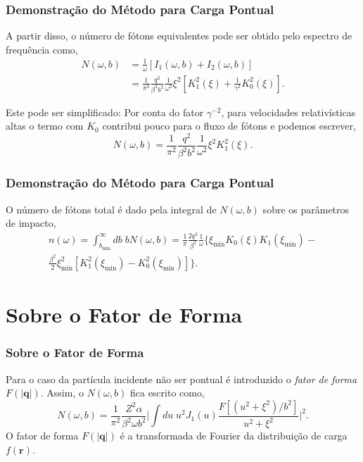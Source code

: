 \documentclass[xcolor=dvipsnames]{beamer}
\renewcommand{\vec}{\mathbf}
\begin{document}
\begin{frame}
	\frametitle{Demonstração do Método para Carga Pontual}
	A partir disso, o número de fótons equivalentes pode ser obtido pelo
	espectro de frequência como,
	\begin{equation}
		\begin{split}
		N(\omega , b) &= \frac{1}{\omega} \left[ I_1 (\omega , b) + I_2(\omega
			, b) \right]\\
			&= \frac{1}{\pi ^2} \frac{q^2} {\beta ^2 b^2}
			\frac{1}{\omega ^2} \xi ^2 \left[K_1^2 (\xi ) + \frac{1}{\gamma ^2}
			K_0 ^2 (\xi ) \right]. \label{eq_EP-SPEC}
		\end{split}
	\end{equation}
	\begin{block}{Este pode ser simplificado:}
		Por conta do fator $\gamma ^{-2}$, para velocidades relativísticas altas o
		termo com $K_0$ contribui pouco para o fluxo de fótons e podemos escrever,
		\begin{equation}
			N(\omega , b) = \frac{1}{\pi ^2} \frac{q^2} {\beta ^2 b^2}
			\frac{1}{\omega ^2} \xi ^2 K_1 ^2 (\xi).
		\end{equation}
	\end{block}
\end{frame}

\begin{frame}
	\frametitle{Demonstração do Método para Carga Pontual}
	O número de fótons total é dado pela integral de $N(\omega , b)$ sobre os
	parâmetros de impacto,
	\begin{multline}
		n(\omega) = \int _{b_{\text{min}}}^\infty db\; bN(\omega , b)  
		= \frac{1}{\pi} \frac{2q^2}{\beta ^2} \frac{1}{\omega} \biggl\{ \xi
		_\text{min} K_0 \left( \xi \right) K_1 \left( \xi _\text{min} \right) - \\
		\frac{\beta ^2}{2} \xi _\text{min} ^2 \left[ K_1 ^2 \left( \xi
		_\text{min} \right) - K_0 ^2 \left( \xi _\text{min} \right) \right]
		\biggr\}. \label{eq_EPT}
	\end{multline}
\end{frame}

\section{Sobre o Fator de Forma}
\begin{frame}
	\frametitle{Sobre o Fator de Forma}
	Para o caso da partícula incidente não ser pontual é introduzido o
	\textit{fator de forma} $F(|\vec{q}|)$. Assim, o $N(\omega , b)$ fica
	escrito como,
	\begin{equation}
		N(\omega , b) = \frac{1}{\pi ^2} \frac{Z^2 \alpha}{\beta ^2 \omega b^2}
		\Bigg| \int du \; u^2 J_1 (u) \frac{F[(u^2 + \xi ^2)/b^2]}{u^2 + \xi ^2}
		\Bigg|^2. \label{eq_EP-SPEC-F}
	\end{equation}
	O fator de forma $F(|\vec{q}|)$ é a transformada de Fourier da distribuição
	de carga $f(\vec{r})$.
\end{frame}
\end{document}
